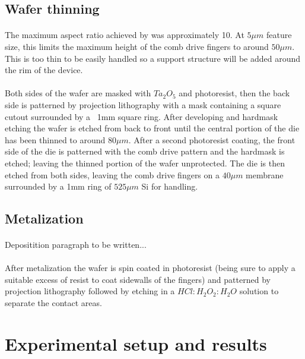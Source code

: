 \documentclass[twocolumn]{article}
\begin{document}
\subsection{Wafer thinning}
\paragraph*{}
The maximum aspect ratio achieved by \cite{SmoothWalls} was approximately 10. At $5 \mu m$ feature
size, this limits the maximum height of the comb drive fingers to around $50 \mu m$. This is too
thin to be easily handled so a support structure will be added around the rim of the device.

\paragraph*{}
Both sides of the wafer are masked with $Ta_2O_5$ and photoresist, then the back side is patterned
by projection lithography with a mask containing a square cutout surrounded by a ~1mm square ring.
After developing and hardmask etching the wafer is etched from back to front until the central
portion of the die has been thinned to around $80 \mu m$. After a second photoresist coating, the
front side of the die is patterned with the comb drive pattern and the hardmask is etched; leaving
the thinned portion of the wafer unprotected. The die is then etched from both sides, leaving the
comb drive fingers on a $40 \mu m$ membrane surrounded by a 1mm ring of $525 \mu m$ Si for handling.

\subsection{Metalization}
\paragraph*{}
Depositition paragraph to be written...

\paragraph*{}
After metalization the wafer is spin coated in photoresist (being sure to apply a suitable excess
of resist to coat sidewalls of the fingers) and patterned by projection lithography followed by
etching in a $HCl:H_2O_2:H_2O$ solution to separate the contact areas.


\section{Experimental setup and results}
\end{document}
